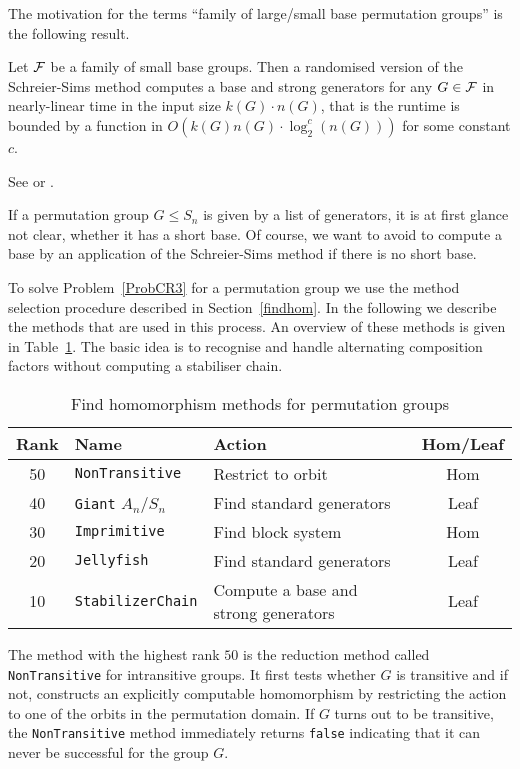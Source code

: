 The motivation for the terms ``family of large/small base permutation
groups'' is the following result.

\begin{Theo}
Let $\mathcal{F}$ be a family of small base groups. Then a randomised version
of the Schreier-Sims method computes a base and strong generators
for any $G \in \mathcal{F}$ in nearly-linear time in the input size $k(G)\cdot
n(G)$, that is the runtime is bounded by a function in
$O(k(G)n(G) \cdot \log^c_2(n(G)))$ for some constant $c$.
\end{Theo}
\proofbeg See \cite{nearlylin} or \cite[Theorem 4.5.5]{Ser}. \proofend

\medskip
If a permutation group $G \le S_n$ is given by a list of generators, it
is at first glance not clear, whether it has a short base. Of course,
we want to avoid to compute a base by an application of the Schreier-Sims
method if there is no short base.

To solve Problem~\ref{ProbCR3} for a permutation group we use the method
selection procedure described in Section~\ref{findhom}. In the following we
describe the methods that are used in this process. An overview of these 
methods is given in Table~\ref{permdb}. The basic idea is to recognise
and handle alternating composition factors without computing a stabiliser 
chain.

\begin{table}[ht]
\begin{center}
\begin{tabular}{|c|l|l|c|}
\hline
Rank & Name & Action & Hom/Leaf \\
\hline
\hline
50 & \texttt{NonTransitive} & Restrict to orbit & Hom \\
\hline
40 & \texttt{Giant} $A_n/S_n$ & Find standard generators & Leaf \\
\hline
30 & \texttt{Imprimitive} & Find block system & Hom \\
\hline
20 & \texttt{Jellyfish} & Find standard generators & Leaf \\
\hline
10 & \texttt{StabilizerChain} & Compute a base and strong generators & Leaf \\
\hline
\end{tabular}
\end{center}
\caption{Find homomorphism methods for permutation groups}
%
\label{permdb}
\end{table}

The method with the highest rank $50$ is the reduction method called
\texttt{NonTransitive} for intransitive groups. It first tests whether
$G$ is transitive and if not, constructs an explicitly
computable homomorphism by restricting the action to one of the orbits in the
permutation domain. If $G$ turns out to be transitive, the
\texttt{NonTransitive} method immediately returns \texttt{false}
indicating that it can never be successful for the group $G$.

